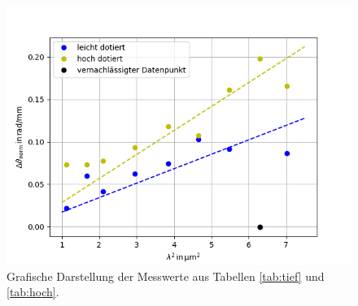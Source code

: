 \begin{figure}[h!]
  \centering
  \includegraphics[scale=0.7]{fig/deltaTheta.png}
  \caption{Grafische Darstellung der Messwerte aus Tabellen \ref{tab:tief} und \ref{tab:hoch}.}
  \label{abb:delta}
\end{figure}
